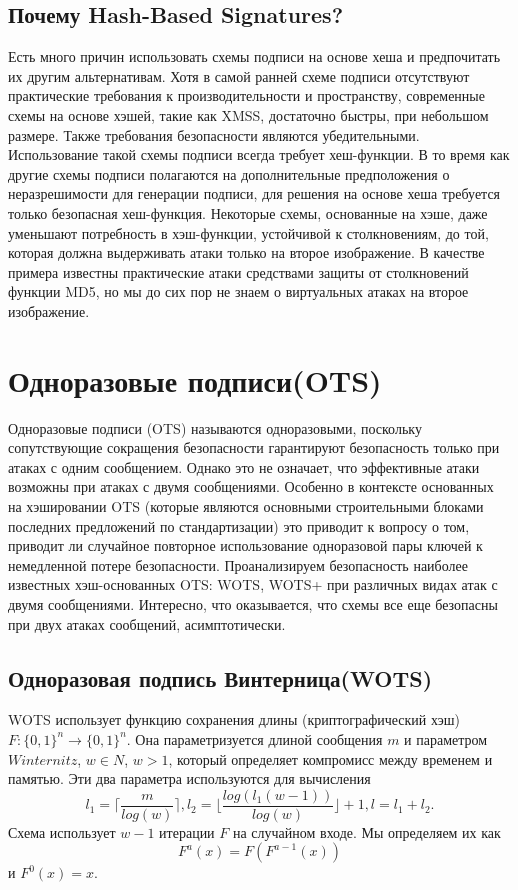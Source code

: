 \documentclass[a4paper, 14pt]{extarticle}
\begin{document}
\subsection{Почему Hash-Based Signatures?}
Есть много причин использовать схемы подписи на основе хеша и предпочитать их другим альтернативам. Хотя в самой ранней схеме подписи отсутствуют практические требования к производительности и пространству, современные схемы на основе хэшей, такие как XMSS, достаточно быстры, при небольшом размере. Также требования безопасности являются убедительными. Использование такой схемы подписи всегда требует хеш-функции. В то время как другие схемы подписи полагаются на дополнительные предположения о неразрешимости для генерации подписи, для решения на основе хеша требуется только безопасная хеш-функция. Некоторые схемы, основанные на хэше, даже уменьшают потребность в хэш-функции, устойчивой к столкновениям, до той, которая должна выдерживать атаки только на второе изображение. В качестве примера известны практические атаки средствами защиты от столкновений функции MD5, но мы до сих пор не знаем о виртуальных атаках на второе изображение.
\newpage

\section{Одноразовые подписи(OTS)}
Одноразовые подписи (OTS) называются одноразовыми, поскольку сопутствующие сокращения безопасности гарантируют безопасность только при атаках с одним сообщением. Однако это не означает, что эффективные атаки возможны при атаках с двумя сообщениями. Особенно в контексте основанных на хэшировании OTS (которые являются основными строительными блоками последних предложений по стандартизации) это приводит к вопросу о том, приводит ли случайное повторное использование одноразовой пары ключей к немедленной потере безопасности. Проанализируем безопасность наиболее известных хэш-основанных OTS: WOTS, WOTS+ при различных видах атак с двумя сообщениями. Интересно, что оказывается, что схемы все еще безопасны при двух атаках сообщений, асимптотически.
\subsection{Одноразовая подпись Винтерница(WOTS)}
WOTS использует функцию сохранения длины (криптографический хэш) $F : \{0, 1\}^{n} \rightarrow \{0, 1\}^{n}$. Она параметризуется длиной сообщения $m$ и параметром $Winternitz$, $w \in N$, $w > 1$, который определяет компромисс между временем и памятью. Эти два параметра используются для вычисления
\[ l_{1} = \Bigg \lceil \frac{m}{log(w)} \Bigg \rceil, l_{2} = \Bigg \lfloor \frac{log(l_{1}(w - 1))}{log(w)} \Bigg \rfloor + 1, l = l_{1} + l_{2}. \]
Схема использует $w - 1$ итерации $F$ на случайном входе. Мы определяем их как
\[ F^{a}(x) = F(F^{a - 1}(x)) \]
и $F^{0}(x) = x$.
\end{document}
